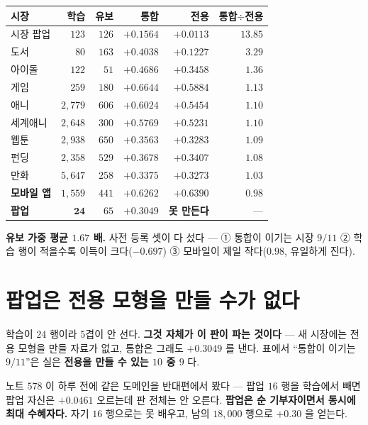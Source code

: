\documentclass[11pt]{article}
\begin{document}
\begin{center}
\begin{tabular}{lrrrrr}
\hline
시장 & 학습 & 유보 & 통합 & 전용 & 통합$\div$전용 \\
\hline
시장 팝업 & $123$ & $126$ & $+0.1564$ & $+0.0113$ & $\mathbf{13.85}$ \\
도서 & $80$ & $163$ & $+0.4038$ & $+0.1227$ & $\mathbf{3.29}$ \\
아이돌 & $122$ & $51$ & $+0.4686$ & $+0.3458$ & $1.36$ \\
게임 & $259$ & $180$ & $+0.6644$ & $+0.5884$ & $1.13$ \\
애니 & $2{,}779$ & $606$ & $+0.6024$ & $+0.5454$ & $1.10$ \\
세계애니 & $2{,}648$ & $300$ & $+0.5769$ & $+0.5231$ & $1.10$ \\
웹툰 & $2{,}938$ & $650$ & $+0.3563$ & $+0.3283$ & $1.09$ \\
펀딩 & $2{,}358$ & $529$ & $+0.3678$ & $+0.3407$ & $1.08$ \\
만화 & $5{,}647$ & $258$ & $+0.3375$ & $+0.3273$ & $1.03$ \\
\textbf{모바일 앱} & $1{,}559$ & $441$ & $+0.6262$ & $+0.6390$ & $\mathbf{0.98}$ \\
\textbf{팝업} & $\mathbf{24}$ & $65$ & $+0.3049$ & \textbf{못 만든다} & --- \\
\hline
\end{tabular}
\end{center}

\textbf{유보 가중 평균 $\mathbf{1.67}$ 배.} 사전 등록 셋이 다 섰다 ---
① 통합이 이기는 시장 $9/11$ ② 학습 행이 적을수록 이득이 크다($-0.697$)
③ 모바일이 제일 작다($0.98$, 유일하게 진다).

\section{팝업은 전용 모형을 만들 수가 없다}

학습이 $24$ 행이라 $5$겹이 안 선다. \textbf{그것 자체가 이 판이 파는
것이다} --- 새 시장에는 전용 모형을 만들 자료가 없고, 통합은 그래도
$+0.3049$ 를 낸다. 표에서 ``통합이 이기는 $9/11$''은 실은
\textbf{전용을 만들 수 있는 $10$ 중 $9$} 다.

노트 $578$ 이 하루 전에 같은 도메인을 반대편에서 봤다 --- 팝업 $16$ 행을
학습에서 빼면 팝업 자신은 $+0.0461$ 오르는데 판 전체는 안 오른다.
\textbf{팝업은 순 기부자이면서 동시에 최대 수혜자다.} 자기 $16$ 행으로는
못 배우고, 남의 $18{,}000$ 행으로 $+0.30$ 을 얻는다.
\end{document}
